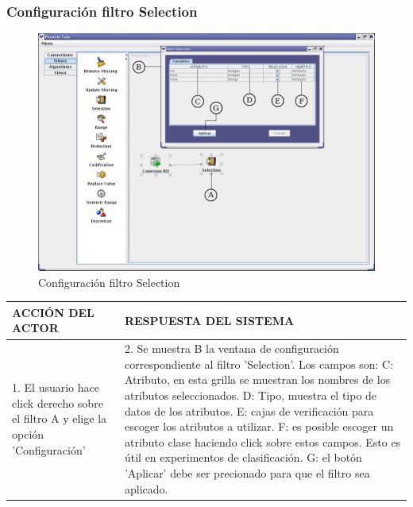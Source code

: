 \subsubsection{Configuraci\'on filtro Selection}
\begin{figure}[ht]
\centering
\includegraphics[width=1\textwidth]{images/fi3ver.png}
\caption{Configuraci\'on filtro Selection}
\end{figure}
\begin{center}
\begin{tabular}{|p{60mm}|p{60mm}|} \hline
ACCI\'ON DEL ACTOR & RESPUESTA DEL SISTEMA \\ \hline
1. El usuario hace click derecho sobre el filtro A y elige la opci\'on 'Configuraci\'on'& 2. Se muestra B la ventana de configuraci\'on correspondiente al filtro 'Selection'. Los campos son: C: Atributo, en esta grilla se muestran los nombres de los atributos seleccionados. D: Tipo, muestra el tipo de datos de los atributos. E: cajas de verificaci\'on para escoger los atributos a utilizar. F: es posible escoger un atributo clase haciendo click sobre estos campos. Esto es \'util en experimentos de clasificaci\'on. G: el bot\'on 'Aplicar' debe ser precionado para que el filtro sea aplicado. \\ \hline
\end{tabular}
\end{center}

\newpage
